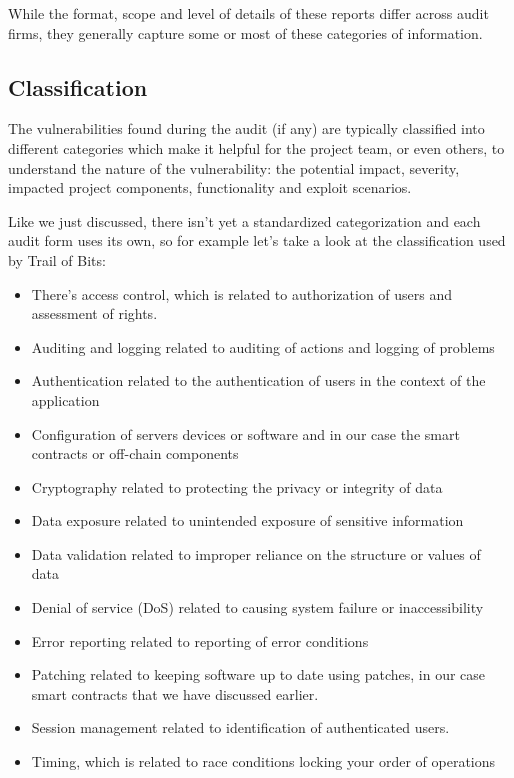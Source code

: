 While the format, scope and level of details of these reports differ
across audit firms, they generally capture some or most of these
categories of information.

\subsection{Classification}\label{classification}

The vulnerabilities found during the audit (if any) are typically
classified into different categories which make it helpful for the
project team, or even others, to understand the nature of the
vulnerability: the potential impact, severity, impacted project
components, functionality and exploit scenarios.

Like we just discussed, there isn't yet a standardized categorization
and each audit form uses its own, so for example let's take a look at
the classification used by Trail of Bits:

\begin{itemize}
\tightlist
\item
  There's access control, which is related to authorization of users and
  assessment of rights.
\item
  Auditing and logging related to auditing of actions and logging of
  problems
\item
  Authentication related to the authentication of users in the context
  of the application
\item
  Configuration of servers devices or software and in our case the smart
  contracts or off-chain components
\item
  Cryptography related to protecting the privacy or integrity of data
\item
  Data exposure related to unintended exposure of sensitive information
\item
  Data validation related to improper reliance on the structure or
  values of data
\item
  Denial of service (DoS) related to causing system failure or
  inaccessibility
\item
  Error reporting related to reporting of error conditions
\item
  Patching related to keeping software up to date using patches, in our
  case smart contracts that we have discussed earlier.
\item
  Session management related to identification of authenticated users.
\item
  Timing, which is related to race conditions locking your order of
  operations
\end{itemize}

